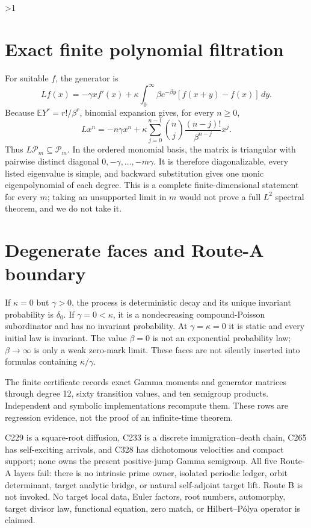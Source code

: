 \documentclass[10pt]{article}
\providecommand{\CRevisionRound}{2}
\newcommand{\E}{\mathbb E}
\newcommand{\Pp}{\mathcal P}
\begin{document}
\ifnum\CRevisionRound>1
\section{Exact finite polynomial filtration}
For suitable $f$, the generator is
\begin{equation}\label{eq:generator}
 Lf(x)=-\gamma x f'(x)+\kappa\int_0^\infty
 \beta e^{-\beta y}[f(x+y)-f(x)]\,dy.
\end{equation}
Because $\E Y^r=r!/\beta^r$, binomial expansion gives, for every $n\geq0$,
\begin{equation}\label{eq:monomial}
 Lx^n=-n\gamma x^n+
 \kappa\sum_{j=0}^{n-1}\binom nj
 \frac{(n-j)!}{\beta^{n-j}}x^j.
\end{equation}
Thus $L\Pp_m\subseteq\Pp_m$.  In the ordered monomial basis, the matrix is
triangular with pairwise distinct diagonal
$0,-\gamma,\ldots,-m\gamma$.  It is therefore diagonalizable, every listed
eigenvalue is simple, and backward substitution gives one monic
eigenpolynomial of each degree.  This is a complete finite-dimensional
statement for every $m$; taking an unsupported limit in $m$ would not prove
a full $L^2$ spectral theorem, and we do not take it.

\section{Degenerate faces and Route-A boundary}
If $\kappa=0$ but $\gamma>0$, the process is deterministic decay and its
unique invariant probability is $\delta_0$.  If $\gamma=0<\kappa$, it is a
nondecreasing compound-Poisson subordinator and has no invariant
probability.  At $\gamma=\kappa=0$ it is static and every initial law is
invariant.  The value $\beta=0$ is not an exponential probability law;
$\beta\to\infty$ is only a weak zero-mark limit.  These faces are not
silently inserted into formulas containing $\kappa/\gamma$.

The finite certificate records exact Gamma moments and generator matrices
through degree 12, sixty transition values, and ten semigroup products.
Independent and symbolic implementations recompute them.  These rows are
regression evidence, not the proof of an infinite-time theorem.

C229 is a square-root diffusion, C233 is a discrete immigration--death
chain, C265 has self-exciting arrivals, and C328 has dichotomous velocities
and compact support; none owns the present positive-jump Gamma semigroup.
All five Route-A layers fail: there is no intrinsic prime owner, isolated
periodic ledger, orbit determinant, target analytic bridge, or natural
self-adjoint target lift.  Route B is not invoked.  No target local data,
Euler factors, root numbers, automorphy, target divisor law, functional
equation, zero match, or Hilbert--P\'olya operator is claimed.
\fi
\end{document}
